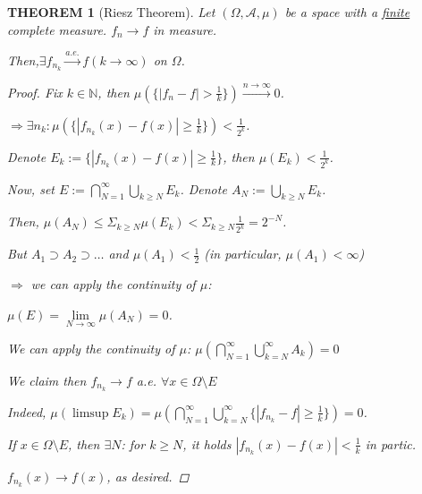 \documentclass[12pt]{article}
\theoremstyle{blueplain}
\newtheorem{theorem}{THEOREM}[section]
\theoremstyle{bluedef}
\theoremstyle{blueremark}
\newcommand{\N}{\mathbb{N}}
\numberwithin{equation}{section}
\begin{document}
\begin{theorem}[Riesz Theorem]

  Let $(\Omega, \mathcal{A}, \mu)$ be a space with a \underline{finite} complete measure. $f_n \rightarrow f$ in measure.

  Then,$\exists f_{n_k} \overset{a.e.}{\rightarrow} f (k \rightarrow \infty)$ on $\Omega$.
  \begin{proof}
    Fix $k \in \N$, then $\mu(\{|f_n - f| > \frac{1}{k}\}) \overset{n \rightarrow \infty}{\rightarrow} 0$.

    $\Rightarrow \exists n_k: \mu(\{|f_{n_k}(x) - f(x)| \geq \frac{1}{k}\}) < \frac{1}{2^k}$.

    Denote $E_k := \{|f_{n_k}(x) - f(x)| \geq \frac{1}{k}\}$, then $\mu(E_k) < \frac{1}{2^k}$.

    Now, set $E := \bigcap_{N=1}^{\infty} \bigcup_{k \geq N} E_k$. Denote $A_N := \bigcup_{k \geq N} E_k$.

    Then, $\mu(A_N) \leq \Sigma_{k \geq N} \mu(E_k) < \Sigma_{k \geq N} \frac{1}{2^k} = 2^{-N}$.

    But $A_1 \supset A_2 \supset \ldots$ and $\mu(A_1) < \frac{1}{2}$ (in particular, $\mu(A_1) < \infty$)

    $\Rightarrow$ we can apply the continuity of $\mu$:

    $\mu(E) = \lim\limits_{N \rightarrow \infty} \mu(A_N) = 0$.

    We can apply the continuity of $\mu$: $\mu(\bigcap_{N=1}^\infty \bigcup_{k=N}^\infty A_k) = 0$

    We claim then $f_{n_k} \to f$ a.e. $\forall x \in \Omega \setminus E$

    Indeed, $\mu(\limsup E_k) = \mu(\bigcap_{N=1}^\infty \bigcup_{k=N}^\infty \{|f_{n_k} - f| \ge \frac{1}{k}\}) = 0$.

    If $x \in \Omega \setminus E$, then $\exists N$: for $k \ge N$, it holds $|f_{n_k}(x) - f(x)| < \frac{1}{k}$ in partic.

    $f_{n_k}(x) \to f(x)$, as desired.
  \end{proof}
\end{theorem}
\end{document}
